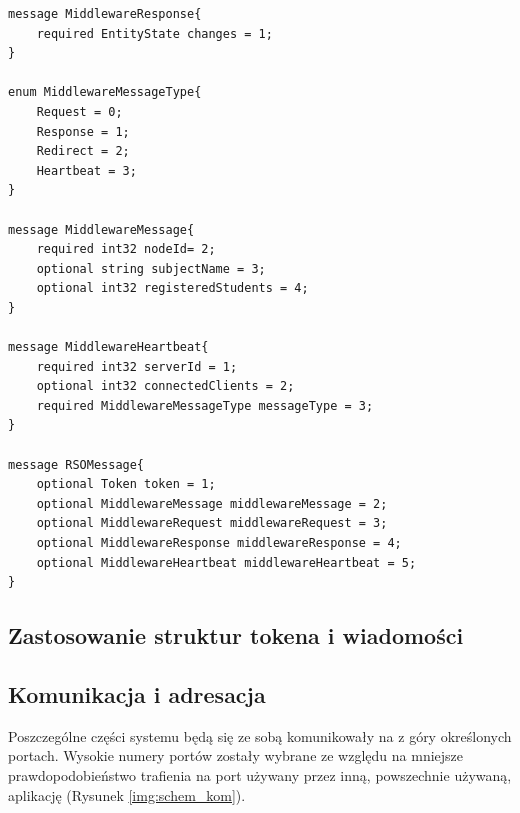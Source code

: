 {\begin{lstlisting}
message MiddlewareResponse{
    required EntityState changes = 1;
}

enum MiddlewareMessageType{
    Request = 0;
    Response = 1;
    Redirect = 2;
    Heartbeat = 3;
}

message MiddlewareMessage{
	required int32 nodeId= 2;
    optional string subjectName = 3;
    optional int32 registeredStudents = 4;    
}

message MiddlewareHeartbeat{
    required int32 serverId = 1;
    optional int32 connectedClients = 2;
    required MiddlewareMessageType messageType = 3;
}

message RSOMessage{
    optional Token token = 1;
    optional MiddlewareMessage middlewareMessage = 2;
    optional MiddlewareRequest middlewareRequest = 3;
    optional MiddlewareResponse middlewareResponse = 4;
    optional MiddlewareHeartbeat middlewareHeartbeat = 5;
}
\end{lstlisting}

\subsection[Zastosowanie struktur tokena i wiadomości]{Zastosowanie struktur tokena i wiadomości}

\subsection[Komunikacja i adresacja]{Komunikacja i adresacja}

\par{Poszczególne części systemu będą się ze sobą komunikowały na z góry określonych portach. Wysokie numery portów zostały wybrane ze względu na mniejsze prawdopodobieństwo trafienia na port używany przez inną, powszechnie używaną, aplikację (Rysunek \ref{img:schem_kom}).}

}
